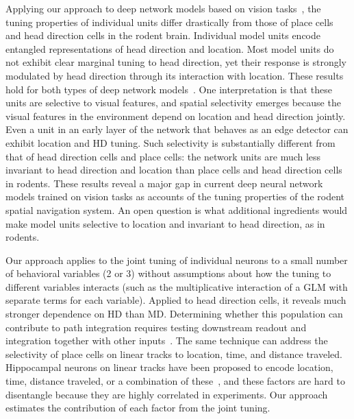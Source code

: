 \documentclass[11pt]{article}
\begin{document}
Applying our approach to deep network models based on vision tasks~\cite{Luo2024,Gornet2024automated}, the tuning properties of individual units differ drastically from those of place cells and head direction cells in the rodent brain.
Individual model units encode entangled representations of head direction and location. Most model units do not exhibit clear marginal tuning to head direction, yet their response is strongly modulated by head direction through its interaction with location. These results hold for both types of deep network models~\cite{Luo2024,Gornet2024automated}.
One interpretation is that these units are selective to visual features, and spatial selectivity emerges because the visual features in the environment depend on location and head direction jointly.
Even a unit in an early layer of the network that behaves as an edge detector can exhibit location and HD tuning. Such selectivity is substantially different from that of head direction cells and place cells: the network units are much less invariant to head direction and location than place cells and head direction cells in rodents.
These results reveal a major gap in current deep neural network models trained on vision tasks as accounts of the tuning properties of the rodent spatial navigation system. An open question is what additional ingredients would make model units selective to location and invariant to head direction, as in rodents.

Our approach applies to the joint tuning of individual neurons to a small number of behavioral variables (2 or 3) without assumptions about how the tuning to different variables interacts (such as the multiplicative interaction of a GLM with separate terms for each variable). Applied to head direction cells, it reveals much stronger dependence on HD than MD. Determining whether this population can contribute to path integration requires testing downstream readout and integration together with other inputs~\cite{Mcnaughton2006}.
The same technique can address the selectivity of place cells on linear tracks to location, time, and distance traveled. Hippocampal neurons on linear tracks have been proposed to encode location, time, distance traveled, or a combination of these~\cite{Eichenbaum2014time,Chen2024}, and these factors are hard to disentangle because they are highly correlated in experiments. Our approach estimates the contribution of each factor from the joint tuning.
\end{document}
